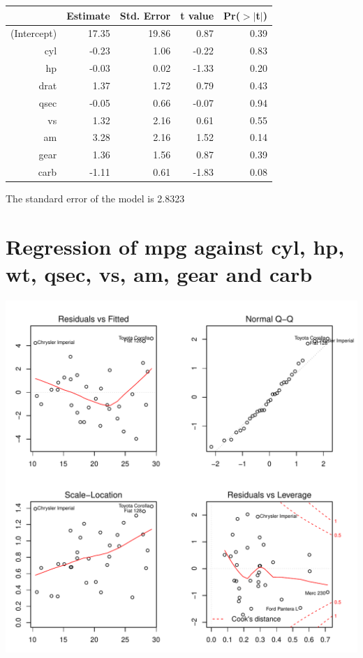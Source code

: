 \documentclass{article}\usepackage[]{graphicx}\usepackage[]{color}
\makeatletter
\def\maxwidth{ %
  \ifdim\Gin@nat@width>\linewidth
    \linewidth
  \else
    \Gin@nat@width
  \fi
}
\newenvironment{knitrout}{}{} %
\makeatother
\begin{document}
\begin{table}[ht]
\centering
\begin{tabular}{rrrrr}
  \hline
 & Estimate & Std. Error & t value & Pr($>$$|$t$|$) \\ 
  \hline
(Intercept) & 17.35 & 19.86 & 0.87 & 0.39 \\ 
  cyl & -0.23 & 1.06 & -0.22 & 0.83 \\ 
  hp & -0.03 & 0.02 & -1.33 & 0.20 \\ 
  drat & 1.37 & 1.72 & 0.79 & 0.43 \\ 
  qsec & -0.05 & 0.66 & -0.07 & 0.94 \\ 
  vs & 1.32 & 2.16 & 0.61 & 0.55 \\ 
  am & 3.28 & 2.16 & 1.52 & 0.14 \\ 
  gear & 1.36 & 1.56 & 0.87 & 0.39 \\ 
  carb & -1.11 & 0.61 & -1.83 & 0.08 \\ 
   \hline
\end{tabular}
\end{table}




The standard error of the model is 2.8323

\newpage

\section{Regression of mpg against cyl, hp, wt, qsec, vs, am, gear and carb }
\begin{knitrout}
\color{fgcolor}

{\centering \includegraphics[width=\maxwidth]{figure/lm-cyl-hp-wt-qsec-vs-am-gear-carb} 

}



\end{knitrout}
\end{document}
